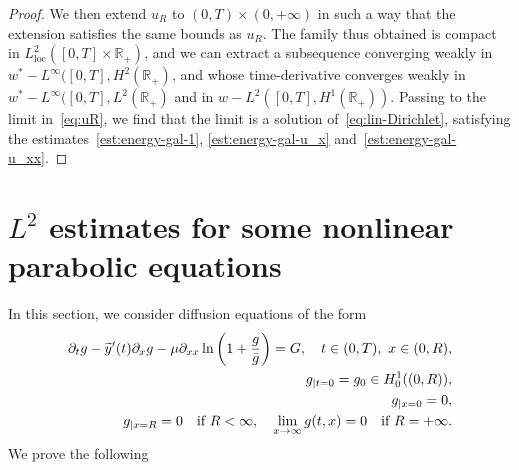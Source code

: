 \documentclass[AHL,Unicode,longabstracts,published]{cedram}
\newcommand{\R}{\mathbb{R}}
\newcommand{\p}{\partial}
\newcommand{\rloc}{\mathrm{loc}}
\let\oldtilde\tilde
\renewcommand*{\tilde}[1]{\mathchoice{\widetilde{#1}}{\widetilde{#1}}{\oldtilde{#1}}{\oldtilde{#1}}}
\begin{document}
\begin{proof}
We then extend $u_R$ to $(0,T)\times (0, +\infty)$ in such a way that the extension satisfies the same bounds as $u_R$. The family thus obtained is compact in $L^2_\rloc([0,T]\times\R_+)$, and we can extract a subsequence converging weakly in $w^*-L^\infty([0,T], H^2(\R_+)$, and whose time-derivative converges weakly in $w^*-L^\infty([0,T], L^2(\R_+)$ and in $w-L^2([0,T], H^1(\R_+))$. Passing to the limit in~\eqref{eq:uR}, we find that the limit is a solution of~\eqref{eq:lin-Dirichlet}, satisfying the estimates~\eqref{est:energy-gal-1}, \eqref{est:energy-gal-u_x} and~\eqref{est:energy-gal-u_xx}.
\end{proof}

\section{\texorpdfstring{$L^2$}{L2} estimates for some nonlinear parabolic equations}

In this section, we consider diffusion equations of the form
\begin{equation}\label{eq:generique-g}
\begin{aligned}
\p_t g -\tilde y'(t)\p_x g-\mu \p_{xx} \ln \left(1+\frac{g}{\bar g}\right)= G,\quad t\in (0,T), \ x\in (0,R),\\
g_{|t=0}=g_0\in H^1_0((0,R)),\\
g_{|x=0}=0,\\
g_{|x=R}=0\quad \text{if }R<\infty, \quad \lim_{x\to \infty} g(t,x)=0\quad \text{if }R=+\infty.
\end{aligned}
\end{equation}
We prove the following
\end{document}
